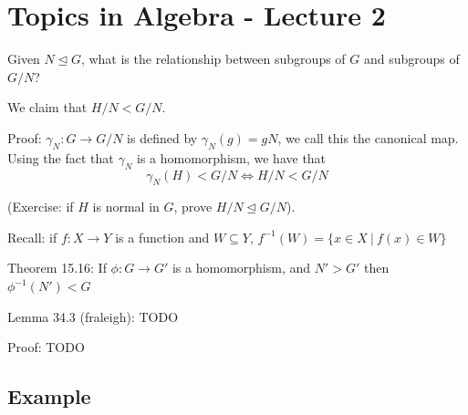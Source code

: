 \documentclass{article}
\begin{document}
    \section*{Topics in Algebra - Lecture 2}

    Given $N \trianglelefteq G$, what is the relationship between subgroups of $G$ and subgroups of $G / N$?

    \centering

    \raggedright

    We claim that $H / N < G / N$.

    Proof: $\gamma_N : G \to G / N$ is defined by $\gamma_N(g) = gN$, we call this the canonical map. Using the fact that $\gamma_N$ is a homomorphism, we have that
    \begin{equation*}
        \gamma_N(H) < G/N \iff H / N < G / N
    \end{equation*}

    (Exercise: if $H$ is normal in $G$, prove $H/N \trianglelefteq G/N$).

    Recall: if $ f : X \to Y$ is a function and $W \subseteq Y$, $f^{-1}(W) = \{x \in X \ \vert \ f(x) \in W\}$

    Theorem 15.16: If $\phi: G \to G'$ is a homomorphism, and $N' > G'$ then $\phi^{-1}(N') < G$

    Lemma 34.3 (fraleigh): TODO

    Proof: TODO

    \subsection*{Example}
    \centering


    \raggedright
\end{document}
